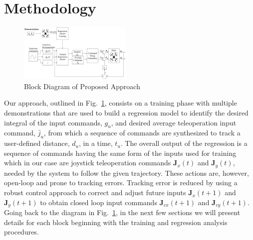 \documentclass[letterpaper, 10 pt, conference]{ieeeconf}  %
\newcommand\NB[1]{$\spadesuit$\footnote{NB: #1}}
\begin{document}
\section{Methodology} \label{sec:approach}

\begin{figure}[ht]
    \includegraphics[width=0.48\textwidth]{images/blocks.PNG}
    \caption{Block Diagram of Proposed Approach}
    \label{fig:blockdiagram}
\end{figure}

Our approach, outlined in Fig.~\ref{fig:blockdiagram}, consists on a training phase with multiple demonstrations that are used to build a regression model to identify the desired integral of the input commands, $g_u$, and desired average teleoperation input command, $\bar{j}_u$, from which a sequence of commands are synthesized to track a user-defined distance, $d_u$, in a time, $t_u$. The overall output of the regression is a sequence of commands having the same form of the inputs used for training which in our case are joystick teleoperation commands $\mathbf{J}_x(t)$ and $\mathbf{J}_y(t)$, needed by the system to follow the given trajectory. These actions are, however, open-loop and prone to tracking errors. Tracking error is reduced by using a robust control approach to correct and adjust future inputs $\mathbf{J}_x(t+1)$ and $\mathbf{J}_y(t+1)$ to obtain closed loop input commands $\mathbf{J}_{cx}(t+1)$ and $\mathbf{J}_{cy}(t+1)$. 
Going back to the diagram in Fig.~\ref{fig:blockdiagram}, in the next few sections we will present details for each block beginning with the training and regression analysis procedures.
%
 

\end{document}
